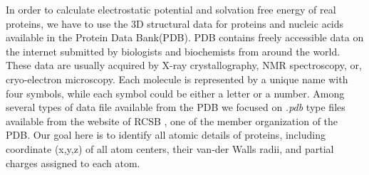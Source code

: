 In order to calculate electrostatic potential and solvation free energy of real proteins,  we have to use the 3D structural data for proteins and nucleic acids available in the Protein Data Bank(PDB). PDB contains freely accessible data on the internet submitted by biologists and biochemists from around the world. These data are usually acquired by  X-ray crystallography, NMR spectroscopy, or, cryo-electron microscopy. Each molecule is represented by a unique name with four symbols, while each symbol could be either a letter or a number. Among several types of data file available from the PDB we focused on \textit{.pdb} type files available from the website of RCSB \cite{RCSB}, one of the member organization of the PDB. Our goal here is to identify all atomic details of proteins, including coordinate (x,y,z) of all atom centers, their van-der Walls radii, and partial charges assigned to each atom. 
